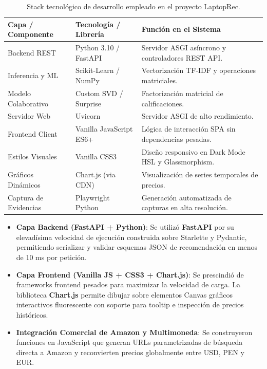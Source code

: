 \documentclass[12pt,a4paper]{article}
\begin{document}
\begin{table}[H]
\centering
\caption{Stack tecnológico de desarrollo empleado en el proyecto LaptopRec.}
\label{tab:tecnologias_stack}
\begin{tabularx}{\textwidth}{p{3.8cm} p{4.2cm} X}
\toprule
\textbf{Capa / Componente} & \textbf{Tecnología / Librería} & \textbf{Función en el Sistema} \\
\midrule
Backend REST & Python 3.10 / FastAPI & Servidor ASGI asíncrono y controladores REST API. \\
Inferencia y ML & Scikit-Learn / NumPy & Vectorización TF-IDF y operaciones matriciales. \\
Modelo Colaborativo & Custom SVD / Surprise & Factorización matricial de calificaciones. \\
Servidor Web & Uvicorn & Servidor ASGI de alto rendimiento. \\
Frontend Client & Vanilla JavaScript ES6+ & Lógica de interacción SPA sin dependencias pesadas. \\
Estilos Visuales & Vanilla CSS3 & Diseño responsivo en Dark Mode HSL y Glassmorphism. \\
Gráficos Dinámicos & Chart.js (via CDN) & Visualización de series temporales de precios. \\
Captura de Evidencias & Playwright Python & Generación automatizada de capturas en alta resolución. \\
\bottomrule
\end{tabularx}
\end{table}

\begin{itemize}
    \item \textbf{Capa Backend (FastAPI + Python)}: Se utilizó \textbf{FastAPI} por su elevadísima velocidad de ejecución construida sobre Starlette y Pydantic, permitiendo serializar y validar esquemas JSON de recomendación en menos de 10 ms por petición.
    \item \textbf{Capa Frontend (Vanilla JS + CSS3 + Chart.js)}: Se prescindió de frameworks frontend pesados para maximizar la velocidad de carga. La biblioteca \textbf{Chart.js} permite dibujar sobre elementos Canvas gráficos interactivos fluorescente con soporte para tooltip e inspección de precios históricos.
    \item \textbf{Integración Comercial de Amazon y Multimoneda}: Se construyeron funciones en JavaScript que generan URLs parametrizadas de búsqueda directa a Amazon y reconvierten precios globalmente entre USD, PEN y EUR.
\end{itemize}
\end{document}
